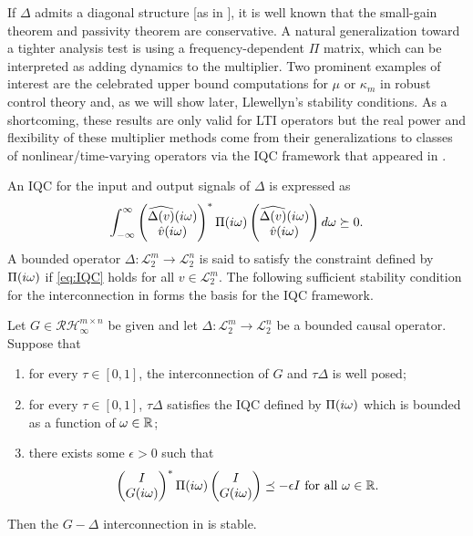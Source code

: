 If $\Delta$ admits a diagonal structure [as in ], it is well known that the small-gain theorem 
and passivity theorem are conservative. A natural generalization toward a tighter analysis test is using a frequency-dependent 
$\Pi$ matrix, {which can be interpreted as} adding dynamics to the multiplier. Two prominent examples of 
interest are the celebrated upper bound computations for $\mu$ or $\kappa_m$ in robust control theory and, as we will 
show later, Llewellyn's stability conditions. As a shortcoming, these results are only valid for LTI operators but the 
real power and flexibility of these multiplier methods come from {their} generalizations to classes of nonlinear/time-varying 
operators via the IQC framework that appeared in \cite{megretski}.

An IQC for the input and output signals of $\Delta$ is expressed as
\begin{equation}{\ensuremath{\int_{-\infty}^\infty{\begin{pmatrix}\widehat{\Delta(v)}(i\omega)\\\hat{v}(i\omega)\end{pmatrix}^*\Pi(i\omega)\begin{pmatrix}\widehat{\Delta(v)}(i\omega)\\\hat{v}(i\omega)\end{pmatrix}d\omega}}} \succeq 0.
\label{eq:IQC}
\end{equation}
A bounded operator $\Delta:\mathcal{L}^m_2\to\mathcal{L}^n_2$ is said to satisfy the constraint defined by $\Pi(i\omega)$ 
if \eqref{eq:IQC} holds for all $v\in\mathcal{L}^m_2$. The following sufficient {stability condition for the interconnection 
in } forms the basis for the IQC framework. 


\begin{thm}\label{IQCthm} Let $G\in\mathcal{RH}^{m\times n}_\infty$ be given and 
let $\Delta:\mathcal{L}^m_2\to\mathcal{L}^n_2$ be a bounded causal operator. Suppose that
\begin{enumerate}
	\item for every $\tau\in[0,1]$, the interconnection of $G$ and $\tau\Delta$ is well posed;
	\item for every $\tau\in[0,1]$, $\tau\Delta$ satisfies the IQC 
    defined by $\Pi(i\omega)$ which is bounded as a function of $\omega\in\mathbb{R}$;
	\item there exists some $\epsilon>0$ such that
	\begin{equation}
	\begin{pmatrix}I\\G(i\omega)\end{pmatrix}^*\Pi(i\omega)\begin{pmatrix}I\\G(i\omega)\end{pmatrix} \preceq -\epsilon I\text{\ for all\ }\omega\in\mathbb{\mathbb{R}}.
	\label{eq:IQCthmFDI}
	\end{equation}
\end{enumerate}
Then the $G-\Delta$ interconnection {in }  is stable.
\end{thm}

